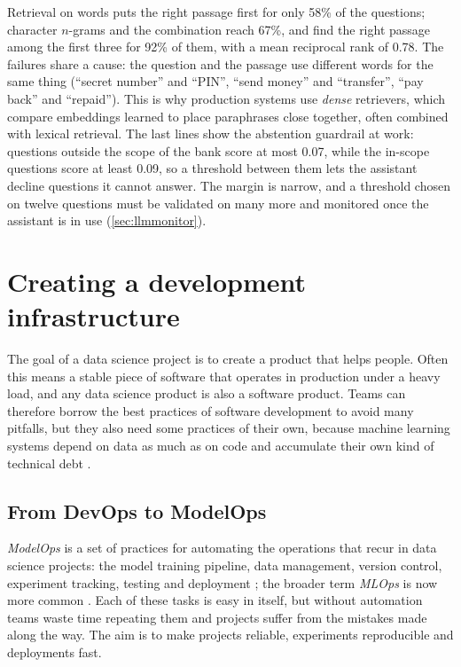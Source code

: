 Retrieval on words puts the right passage first for only 58\% of the questions; character $n$-grams and the combination reach 67\%,
and find the right passage among the first three for 92\% of them, with a mean reciprocal rank of 0.78. The failures share a cause:
the question and the passage use different words for the same thing (``secret number'' and ``PIN'', ``send money'' and
``transfer'', ``pay back'' and ``repaid''). This is why production systems use \emph{dense} retrievers, which compare embeddings
learned to place paraphrases close together, often combined with lexical retrieval. The last lines show the abstention guardrail at
work: questions outside the scope of the bank score at most 0.07, while the in-scope questions score at least 0.09, so a threshold
between them lets the assistant decline questions it cannot answer. The margin is narrow, and a threshold chosen on twelve questions
must be validated on many more and monitored once the assistant is in use (\cref{sec:llmmonitor}).

\section{Creating a development infrastructure}\label{sec:infrastructure}

The goal of a data science project is to create a product that helps people. Often this means a
stable piece of software that operates in production under a heavy load, and any data science product
is also a software product. Teams can therefore borrow the best practices of software development to
avoid many pitfalls, but they also need some practices of their own, because machine learning systems
depend on data as much as on code and accumulate their own kind of technical debt
\citep{sculley2015hidden,amershi2019software}.

\subsection{From DevOps to ModelOps}

\emph{ModelOps} is a set of practices for automating the operations that recur in data science
projects: the model training pipeline, data management, version control, experiment tracking, testing
and deployment \citep{dubovikov2019managing}; the broader term \emph{MLOps} is now more common
\citep{kreuzberger2023mlops}. Each of these tasks is easy in itself, but without automation teams waste
time repeating them and projects suffer from the mistakes made along the way. The aim is to make
projects reliable, experiments reproducible and deployments fast.

